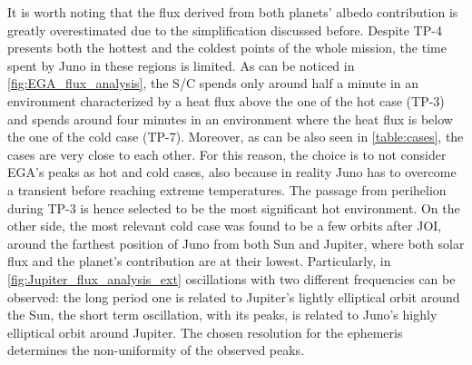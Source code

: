 \vspace*{4mm}

It is worth noting that the flux derived from both planets' albedo contribution is greatly overestimated due to the simplification discussed before.
Despite TP-4 presents both the hottest and the coldest points of the whole mission, the time spent by Juno in these regions is limited.
As can be noticed in \autoref{fig:EGA_flux_analysis}, the S/C spends only around half a minute in an environment characterized by a heat flux above the one of the hot case (TP-3) and spends around four minutes in an environment where the heat flux is below the one of the cold case (TP-7).
Moreover, as can be also seen in \autoref{table:cases}, the cases are very close to each other.
For this reason, the choice is to not consider EGA's peaks as hot and cold cases, also because in reality Juno has to overcome a transient before reaching extreme temperatures.
The passage from perihelion during TP-3 is hence selected to be the most significant hot environment.
On the other side, the most relevant cold case was found to be a few orbits after JOI, around the farthest position of Juno from both Sun and Jupiter, where both solar flux and the planet's contribution are at their lowest.
Particularly, in \autoref{fig:Jupiter_flux_analysis_ext} oscillations with two different frequencies can be observed: the long period one is related to Jupiter's lightly elliptical orbit around the Sun, the short term oscillation, with its peaks, is related to Juno's highly elliptical orbit around Jupiter.
The chosen resolution for the ephemeris determines the non-uniformity of the observed peaks.